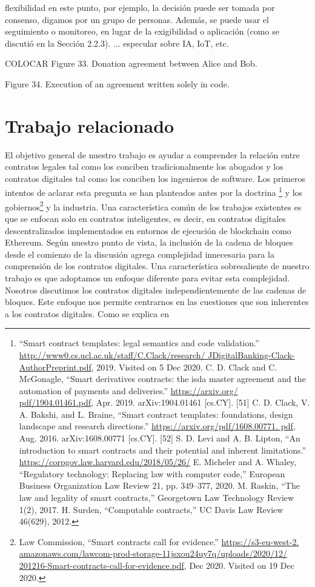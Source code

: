 \documentclass[12pt]{report} %
\begin{document}
\begin{itemize}
flexibilidad en este punto, por ejemplo, la decisión puede ser tomada por consenso, digamos por un grupo de personas. Además, se puede usar el seguimiento o monitoreo, en lugar de la exigibilidad o aplicación (como se discutió en la Sección 2.2.3).
... especular sobre IA, IoT, etc.

COLOCAR Figure 33. Donation agreement between Alice and Bob.

Figure 34. Execution of an agreement written solely in code.

\section{Trabajo relacionado }

El objetivo general de nuestro trabajo es ayudar a comprender la relación entre contratos legales tal como los conciben tradicionalmente los abogados y los contratos digitales tal como los conciben los ingenieros de software. Los primeros intentos de aclarar esta pregunta se han planteados antes por la doctrina \footnote{\cite{Christopher2019}“Smart contract templates: legal semantics and code validation.” \url{http://www0.cs.ucl.ac.uk/staff/C.Clack/research/ JDigitalBanking-Clack-AuthorPreprint.pdf}, 2019. Visited on 5 Dec 2020. C. D. Clack and C. McGonagle, “Smart derivatives contracts: the isda master agreement and the automation of payments and deliveries.” \url{https://arxiv.org/ pdf/1904.01461.pdf}, Apr. 2019. arXiv:1904.01461 [cs.CY]. [51] C. D. Clack, V. A. Bakshi, and L. Braine, “Smart contract templates: foundations, design landscape and research directions.” \url{https://arxiv.org/pdf/1608.00771. pdf}, Aug. 2016. arXiv:1608.00771 [cs.CY]. [52] S. D. Levi and A. B. Lipton, “An introduction to smart contracts and their potential and inherent limitations.” \url{https://corpgov.law.harvard.edu/2018/05/26/} E. Micheler and A. Whaley, “Regulatory technology: Replacing law with computer code,” European Business Organization Law Review 21, pp. 349–377, 2020. M. Raskin, “The law and legality of smart contracts,” Georgetown Law Technology Review 1(2), 2017. H. Surden, “Computable contracts,” UC Davis Law Review 46(629), 2012. } y los gobiernos\footnote{\cite{LawCommission2020}Law Commission, “Smart contracts call for evidence.” \url{https://s3-eu-west-2. amazonaws.com/lawcom-prod-storage-11jsxou24uy7q/uploads/2020/12/ 201216-Smart-contracts-call-for-evidence.pdf}, Dec 2020. Visited on 19 Dec 2020.}  y la industria. Una característica común de los trabajos existentes es que se enfocan solo en contratos inteligentes, es decir, en contratos digitales descentralizados implementados en entornos de ejecución de blockchain como Ethereum. Según nuestro punto de vista, la inclusión de la cadena de bloques desde el comienzo de la discusión agrega complejidad innecesaria para la comprensión de los contratos digitales. Una característica sobresaliente de nuestro trabajo es que adoptamos un enfoque diferente para evitar esta complejidad. Nosotros discutimos los contratos digitales independientemente de las cadenas de bloques. Este enfoque nos permite centrarnos en las cuestiones que son inherentes a los contratos digitales. Como se explica en 
\end{itemize}
\end{document}
